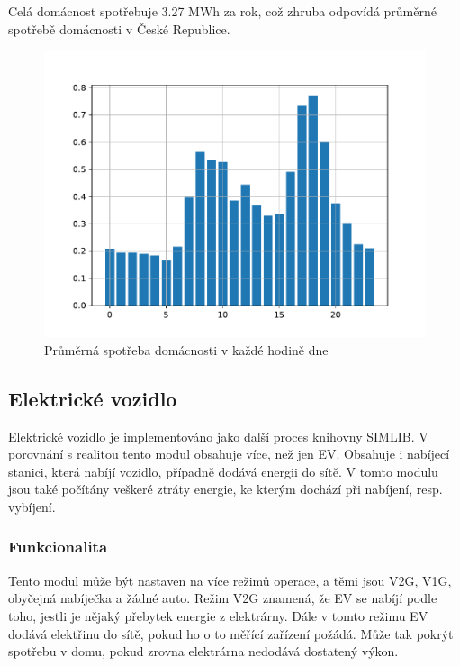 \documentclass[12pt,a4paper]{article}
\begin{document}
Celá domácnost spotřebuje 3.27 MWh za rok, což zhruba odpovídá průměrné spotřebě domácnosti v České Republice\cite{CEZ}.

\begin{figure}
\includegraphics[width=\linewidth]{img/average_day_load.pdf}
\caption{Průměrná spotřeba domácnosti v každé hodině dne}
\label{fig:average_day_load}
\end{figure}





\subsection{Elektrické vozidlo}
Elektrické vozidlo je implementováno jako další proces knihovny SIMLIB.
V porovnání s realitou tento modul obsahuje více, než jen EV.
Obsahuje i nabíjecí stanici, která nabíjí vozidlo, případně dodává energii do sítě.
V tomto modulu jsou také počítány veškeré ztráty energie, ke kterým dochází při nabíjení, resp. vybíjení.

\subsubsection{Funkcionalita}
Tento modul může být nastaven na více režimů operace, a těmi jsou V2G, V1G, obyčejná nabíječka a žádné auto.
Režim V2G znamená, že EV se nabíjí podle toho, jestli je nějaký přebytek energie z elektrárny.
Dále v tomto režimu EV dodává elektřinu do sítě, pokud ho o to měřící zařízení požádá.
Může tak pokrýt spotřebu v domu, pokud zrovna elektrárna nedodává dostatený výkon.
\end{document}
